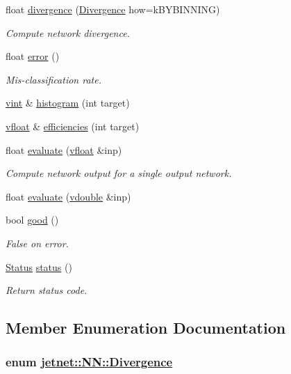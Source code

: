 \begin{CompactItemize}
float \hyperlink{classjetnet_1_1NN_a27}{divergence} (\hyperlink{classjetnet_1_1NN_w16}{Divergence} how=k\-BYBINNING)
\begin{CompactList}\small\item\em Compute network divergence. \item\end{CompactList}\item 
float \hyperlink{classjetnet_1_1NN_a28}{error} ()
\begin{CompactList}\small\item\em Mis-classification rate. \item\end{CompactList}\item 
\hyperlink{jetnet_8hpp_a2}{vint} \& \hyperlink{classjetnet_1_1NN_a29}{histogram} (int target)
\item 
\hyperlink{jetnet_8hpp_a0}{vfloat} \& \hyperlink{classjetnet_1_1NN_a30}{efficiencies} (int target)
\item 
float \hyperlink{classjetnet_1_1NN_a31}{evaluate} (\hyperlink{jetnet_8hpp_a0}{vfloat} \&inp)
\begin{CompactList}\small\item\em Compute network output for a single output network. \item\end{CompactList}\item 
float \hyperlink{classjetnet_1_1NN_a32}{evaluate} (\hyperlink{PoissonGammaFit_8hpp_a0}{vdouble} \&inp)
\item 
bool \hyperlink{classjetnet_1_1NN_a33}{good} ()
\begin{CompactList}\small\item\em False on error. \item\end{CompactList}\item 
\hyperlink{classjetnet_1_1NN_w19}{Status} \hyperlink{classjetnet_1_1NN_a34}{status} ()
\begin{CompactList}\small\item\em Return status code. \item\end{CompactList}\end{CompactItemize}


\subsection{Member Enumeration Documentation}
\hypertarget{classjetnet_1_1NN_w16}{
\subsubsection[Divergence]{\setlength{\rightskip}{0pt plus 5cm}enum \hyperlink{classjetnet_1_1NN_w16}{jetnet::NN::Divergence}}}
\label{classjetnet_1_1NN_w16}


